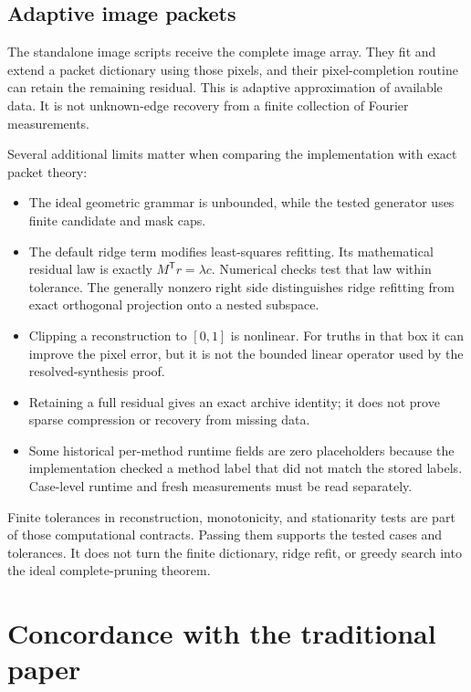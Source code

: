 \documentclass[11pt]{article}
\newcommand{\tightlist}{\setlength{\itemsep}{0pt}\setlength{\parskip}{0pt}}
\begin{document}
\hypertarget{adaptive-image-packets}{%
\subsection{Adaptive image packets}\label{adaptive-image-packets}}

The standalone image scripts receive the complete image array. They fit and extend a packet dictionary using those pixels, and their pixel-completion routine can retain the remaining residual. This is adaptive approximation of available data. It is not unknown-edge recovery from a finite collection of Fourier measurements.

Several additional limits matter when comparing the implementation with exact packet theory:

\begin{itemize}
\tightlist
\item
  The ideal geometric grammar is unbounded, while the tested generator uses finite candidate and mask caps.
\item
  The default ridge term modifies least-squares refitting. Its mathematical residual law is exactly \(M^{\mathsf T}r=\lambda c\). Numerical checks test that law within tolerance. The generally nonzero right side distinguishes ridge refitting from exact orthogonal projection onto a nested subspace.
\item
  Clipping a reconstruction to \([0,1]\) is nonlinear. For truths in that box it can improve the pixel error, but it is not the bounded linear operator used by the resolved-synthesis proof.
\item
  Retaining a full residual gives an exact archive identity; it does not prove sparse compression or recovery from missing data.
\item
  Some historical per-method runtime fields are zero placeholders because the implementation checked a method label that did not match the stored labels. Case-level runtime and fresh measurements must be read separately.
\end{itemize}

Finite tolerances in reconstruction, monotonicity, and stationarity tests are part of those computational contracts. Passing them supports the tested cases and tolerances. It does not turn the finite dictionary, ridge refit, or greedy search into the ideal complete-pruning theorem.

\hypertarget{concordance-with-the-traditional-paper}{%
\section{Concordance with the traditional paper}\label{concordance-with-the-traditional-paper}}
\end{document}
